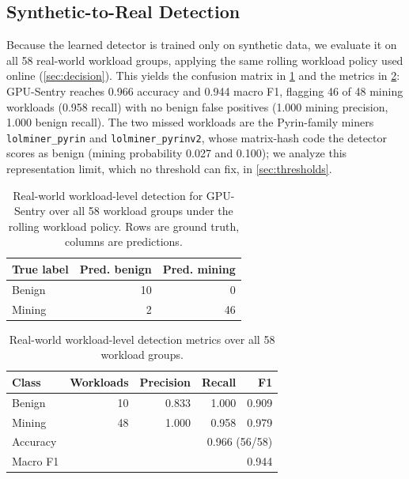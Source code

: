 \subsection{Synthetic-to-Real Detection}

Because the learned detector is trained only on synthetic data, we evaluate it on all 58 real-world workload groups, applying the same rolling workload policy used online (\cref{sec:decision}). This yields the confusion matrix in \cref{tab:realworld_detection} and the metrics in \cref{tab:realworld_metrics}: GPU-Sentry reaches 0.966 accuracy and 0.944 macro F1, flagging 46 of 48 mining workloads (0.958 recall) with no benign false positives (1.000 mining precision, 1.000 benign recall). The two missed workloads are the Pyrin-family miners \texttt{lolminer\_pyrin} and \texttt{lolminer\_pyrinv2}, whose matrix-hash code the detector scores as benign (mining probability 0.027 and 0.100); we analyze this representation limit, which no threshold can fix, in \cref{sec:thresholds}.

\begin{table}[t]
    \centering
    \caption{Real-world workload-level detection for GPU-Sentry over all 58 workload groups under the rolling workload policy. Rows are ground truth, columns are predictions.}
    \label{tab:realworld_detection}
    \begin{tabular}{lrr}
        \toprule
        True label & Pred. benign & Pred. mining \\
        \midrule
        Benign & 10 & 0 \\
        Mining & 2 & 46 \\
        \bottomrule
    \end{tabular}
\end{table}

\begin{table}[t]
    \centering
    \caption{Real-world workload-level detection metrics over all 58 workload groups.}
    \label{tab:realworld_metrics}
    \begin{tabular}{lrrrr}
        \toprule
        Class & Workloads & Precision & Recall & F1 \\
        \midrule
        Benign & 10 & 0.833 & 1.000 & 0.909 \\
        Mining & 48 & 1.000 & 0.958 & 0.979 \\
        \midrule
        \multicolumn{1}{l}{Accuracy} & \multicolumn{4}{r}{0.966 (56/58)} \\
        \multicolumn{1}{l}{Macro F1} & \multicolumn{4}{r}{0.944} \\
        \bottomrule
    \end{tabular}
\end{table}

